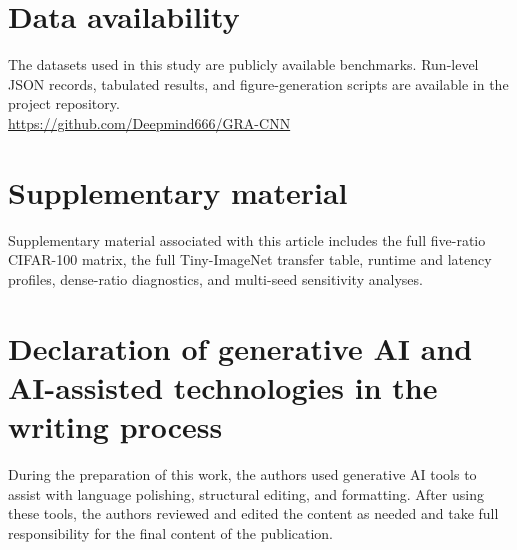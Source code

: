 \documentclass[preprint,12pt]{elsarticle}
\begin{document}
\section*{Data availability}
The datasets used in this study are publicly available benchmarks. Run-level JSON records, tabulated results, and figure-generation scripts are available in the project repository.\\
\url{https://github.com/Deepmind666/GRA-CNN}

\section*{Supplementary material}
Supplementary material associated with this article includes the full five-ratio CIFAR-100 matrix, the full Tiny-ImageNet transfer table, runtime and latency profiles, dense-ratio diagnostics, and multi-seed sensitivity analyses.

\section*{Declaration of generative AI and AI-assisted technologies in the writing process}
During the preparation of this work, the authors used generative AI tools to assist with language polishing, structural editing, and formatting. After using these tools, the authors reviewed and edited the content as needed and take full responsibility for the final content of the publication.



\end{document}
